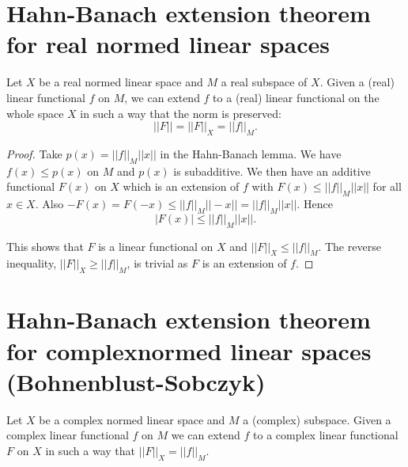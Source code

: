 \section[Hahn-Banach extension theorem...]{Hahn-Banach extension theorem for real normed linear spaces}\label{chap2:sec4}

\begin{theorem*}%
 Let $X$ be a real normed linear space and $M$ a real subspace of
 $X$. Given a (real) linear functional $f$ on $M$, we can extend $f$
 to a (real) linear functional on the whole space $X$ in such a way
 that the norm is preserved: 
 $$
 || F || = || F ||_X = || f ||_M.
 $$
\end{theorem*}

\begin{proof}
 Take $p(x) = || f||_M ||x||$ in the Hahn-Banach lemma. We have
 $f(x) \le p(x)$ on $M$ and $p(x)$ is subadditive. We then have an
 additive functional $F(x)$ on $X$ which is an extension of $f$ with
 $F(x) \le || f ||_M || x ||$ for all $x \in X$. Also $-F(x) = F(-x)
 \le ||f||_M ||-x|| = || f||_M ||x||$. Hence 
 $$
 | F(x) | \le ||f||_M ||x||. 
 $$
 
 This shows that $F$ is a linear functional on $X$ and $|| F ||_X \le
 || f ||_M$. The reverse inequality, $|| F ||_X \ge || f ||_M$, is
 trivial as $F$ is an extension of $f$. 
\end{proof}

\section[Hahn-Banach extension theorem for...]{Hahn-Banach extension theorem for complex\hfill\break normed linear
 spaces (Bohnenblust-Sobczyk)}\label{chap2:sec5} 

\begin{theorem*}%
 Let $X$ be a complex normed linear space and $M$ a (complex)
 subspace. Given a complex linear functional $f$ on $M$ we can extend
 $f$ to a complex linear functional $F$ on $X$ in such a way that
 $||F||_X = ||f||_M$. 
\end{theorem*}

